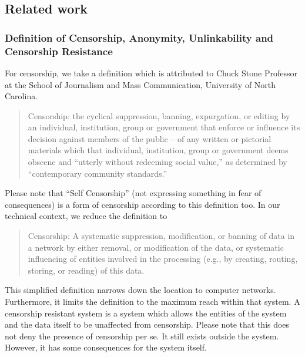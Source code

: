 \documentclass[10pt,journal,compsoc,twocolumn,twoside]{IEEEtran}
\begin{document}
%

\subsection{Related work}
\subsubsection{Definition of Censorship, Anonymity, Unlinkability and Censorship Resistance}
For censorship, we take a definition which is attributed to Chuck Stone Professor at the School of Journalism and Mass Communication, University of North Carolina. 
\begin{quote}
	Censorship: the cyclical suppression, banning, expurgation, or editing by an individual, institution, group or government that enforce or influence its decision against members of the public -- of any written or pictorial materials which that individual, institution, group or government deems obscene and ``utterly without redeeming social value,'' as determined by ``contemporary community standards.''
\end{quote}

Please note that ``Self Censorship'' (not expressing something in fear of consequences)  is a form of censorship according to this definition too. In our technical context, we reduce the definition to
\begin{quote}
	Censorship: A systematic suppression, modification, or banning of data in a network by either removal, or modification of the data, or systematic influencing of entities involved in the processing (e.g., by creating, routing, storing, or reading) of this data.
\end{quote}
This simplified definition narrows down the location to computer networks.  Furthermore, it limits the definition to the maximum reach within that system. A censorship resistant system is a system which allows the entities of the system and the data itself to be unaffected from censorship. Please note that this does not deny the presence of censorship per se. It still exists outside the system. However, it has some consequences for the system itself.
\end{document}

